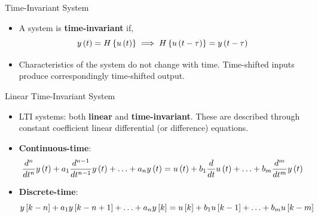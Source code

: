 \documentclass[aspectratio=169]{beamer}
\def\lp{\ensuremath\left(}
\def\rp{\ensuremath\right)}
\def\lc{\ensuremath\left\{}
\def\rc{\ensuremath\right\}}
\def\ls{\ensuremath\left[}
\def\rs{\ensuremath\right]}
\begin{document}
\begin{frame}{Time-Invariant System}
\begin{center}
\end{center}
\begin{itemize}
    \item A system is \textbf{time-invariant} if,
    \[ y\lp t\rp = H\lc u\lp t\rp\rc \implies H\lc u \lp t - \tau \rp \rc = y\lp t - \tau \rp \]

    \item Characteristics of the system do not change with time. Time-shifted inputs produce correspondingly time-shifted output.
\end{itemize}
\end{frame}


\begin{frame}{Linear Time-Invariant System}
\begin{center}
\end{center}
\begin{itemize}
    \item LTI systems: both \textbf{linear} and \textbf{time-invariant}. These are described through constant coefficient linear differential (or difference) equations.

    \item \textbf{Continuous-time}: 
    $$\frac{d^n}{dt^n}y\lp t\rp + a_{1}\frac{d^{n-1}}{dt^{n-1}}y\lp t\rp + \ldots + a_ny\lp t\rp = u\lp t\rp + b_1\frac{d}{dt}u\lp t\rp + \ldots + b_m\frac{d^m}{dt^m}y\lp t\rp $$

    \item \textbf{Discrete-time}:
    $$y\ls k - n\rs + a_1y\ls k - n + 1\rs + \ldots + a_ny\ls k\rs = u\ls k\rs + b_1u\ls k-1\rs + \ldots + b_m u\ls k-m\rs$$
\end{itemize}
\end{frame}
\end{document}
